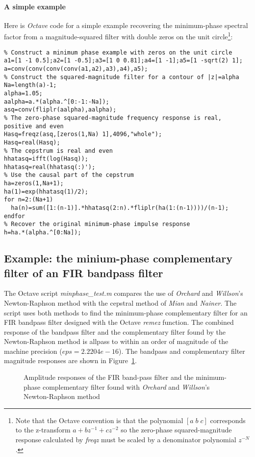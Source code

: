 \documentclass[a4paper,twoside,10pt,english]{report}
\begin{document}
\paragraph{A simple example}
Here is \emph{Octave} code for a simple example recovering the minimum-phase
spectral factor from a magnitude-squared filter with double zeros on the unit
circle\footnote{Note that the Octave convention is that the polynomial
  $\left[a\; b\; c\right]$ corresponds to the z-transform $a+bz^{-1}+cz^{-2}$ so
  the zero-phase squared-magnitude response calculated by \emph{freqz} must be
  scaled by a denominator polynomial $z^{-N}$.}:
\begin{small}
\begin{verbatim}
% Construct a minimum phase example with zeros on the unit circle
a1=[1 -1 0.5];a2=[1 -0.5];a3=[1 0 0.81];a4=[1 -1];a5=[1 -sqrt(2) 1];
a=conv(conv(conv(conv(a1,a2),a3),a4),a5);
% Construct the squared-magnitude filter for a contour of |z|=alpha
Na=length(a)-1;
alpha=1.05;
aalpha=a.*(alpha.^[0:-1:-Na]);
asq=conv(fliplr(aalpha),aalpha);
% The zero-phase squared-magnitude frequency response is real, positive and even
Hasq=freqz(asq,[zeros(1,Na) 1],4096,"whole");
Hasq=real(Hasq);
% The cepstrum is real and even
hhatasq=ifft(log(Hasq));
hhatasq=real(hhatasq(:)');
% Use the causal part of the cepstrum
ha=zeros(1,Na+1);
ha(1)=exp(hhatasq(1)/2);
for n=2:(Na+1)
  ha(n)=sum([1:(n-1)].*hhatasq(2:n).*fliplr(ha(1:(n-1))))/(n-1);
endfor
% Recover the original minimum-phase impulse response 
h=ha.*(alpha.^[0:Na]);
\end{verbatim}
\end{small}
\subsection{Example: the minium-phase complementary filter of an FIR bandpass filter}
The Octave script \emph{minphase\_test.m} compares the use of 
\emph{Orchard} and \emph{Willson}'s Newton-Raphson method with the cepstral
method of \emph{Mian} and \emph{Nainer}. The script uses both methods to find
the minimum-phase complementary filter for an FIR bandpass filter designed with
the Octave \emph{remez} function. The combined response of the bandpass filter
and the complementary filter found by the Newton-Raphson method is allpass to 
within an order of magnitude of the machine precision ($eps=2.2204e-16$). The
bandpass and complementary filter magnitude responses are shown in 
Figure~\ref{fig:minphase-brz-brzc-response}.
\begin{figure}[!htbp]
\begin{center}
\scalebox{0.7}{}
\caption{Amplitude responses of the FIR band-pass filter and the minimum-phase
complementary filter found with \emph{Orchard} and \emph{Willson}'s 
Newton-Raphson method}
\label{fig:minphase-brz-brzc-response}
\end{center}
\end{figure}
\end{document}
